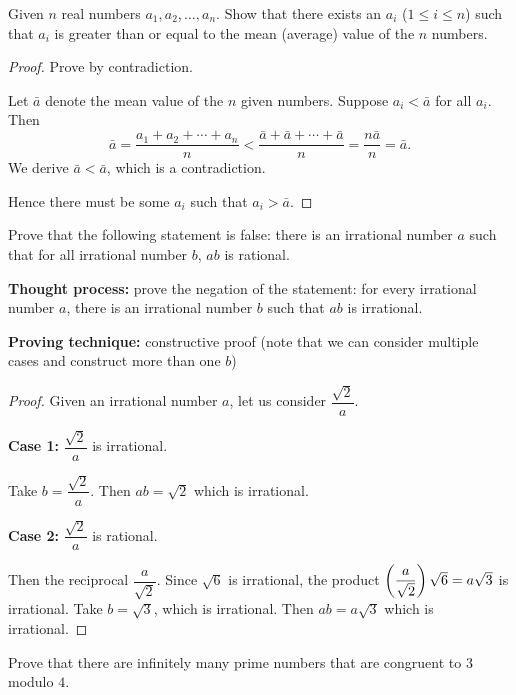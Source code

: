 \begin{prbm}
Given $n$ real numbers $a_1,a_2,\dots,a_n$. Show that there exists an $a_i$ ($1\le i\le n$) such that $a_i$ is greater than or equal to the mean (average) value of the $n$ numbers.
\end{prbm}

\begin{proof}
Prove by contradiction.

Let $\bar{a}$ denote the mean value of the $n$ given numbers. Suppose $a_i<\bar{a}$ for all $a_i$. Then
\[ \bar{a}=\frac{a_1+a_2+\cdots+a_n}{n}<\frac{\bar{a}+\bar{a}+\cdots+\bar{a}}{n}=\frac{n\bar{a}}{n}=\bar{a}. \]
We derive $\bar{a}<\bar{a}$, which is a contradiction.

Hence there must be some $a_i$ such that $a_i>\bar{a}$.
\end{proof}

\begin{prbm}
Prove that the following statement is false: there is an irrational number $a$ such that for all irrational number $b$, $ab$ is rational.
\end{prbm}

\textbf{Thought process:} prove the negation of the statement: for every irrational number $a$, there is an irrational number $b$ such that $ab$ is irrational.

\textbf{Proving technique:} constructive proof (note that we can consider multiple cases and construct more than one $b$)

\begin{proof}
Given an irrational number $a$, let us consider $\dfrac{\sqrt{2}}{a}$.

\textbf{Case 1:} $\dfrac{\sqrt{2}}{a}$ is irrational.

Take $b=\dfrac{\sqrt{2}}{a}$. Then $ab=\sqrt{2}$ which is irrational.

\textbf{Case 2:} $\dfrac{\sqrt{2}}{a}$ is rational.

Then the reciprocal $\dfrac{a}{\sqrt{2}}$. Since $\sqrt{6}$ is irrational, the product $\left(\dfrac{a}{\sqrt{2}}\right)\sqrt{6}=a\sqrt{3}$ is irrational. Take $b=\sqrt{3}$, which is irrational. Then $ab=a\sqrt{3}$ which is irrational.
\end{proof}

\begin{prbm}
Prove that there are infinitely many prime numbers that are congruent to $3$ modulo $4$.
\end{prbm}

